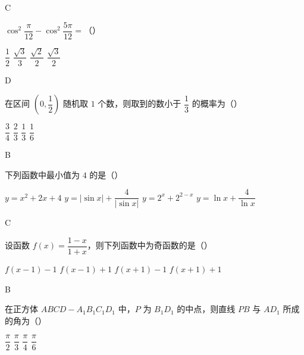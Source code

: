 \begin{answer}
C
\end{answer}

\begin{problem}
\(\cos^2\dfrac{\pi}{12}-\cos^2\dfrac{5\pi}{12}=\)（\quad）

\choices
    {\(\dfrac{1}{2}\)}
    {\(\dfrac{\sqrt3}{3}\)}
    {\(\dfrac{\sqrt2}{2}\)}
    {\(\dfrac{\sqrt3}{2}\)}
\end{problem}

\begin{answer}
D
\end{answer}

\begin{problem}
在区间 \(\left(0,\dfrac{1}{2}\right)\) 随机取 \(1\) 个数，则取到的数小于 \(\dfrac{1}{3}\) 的概率为（\quad）

\choices
    {\(\dfrac{3}{4}\)}
    {\(\dfrac{2}{3}\)}
    {\(\dfrac{1}{3}\)}
    {\(\dfrac{1}{6}\)}
\end{problem}

\begin{answer}
B
\end{answer}

\begin{problem}
下列函数中最小值为 \(4\) 的是（\quad）

\choices
    {\(y=x^2+2x+4\)}
    {\(y=|\sin x|+\dfrac{4}{|\sin x|}\)}
    {\(y=2^x+2^{2-x}\)}
    {\(y=\ln x+\dfrac{4}{\ln x}\)}
\end{problem}

\begin{answer}
C
\end{answer}

\begin{problem}
设函数 \(f(x)=\dfrac{1-x}{1+x}\)，则下列函数中为奇函数的是（\quad）

\choices
    {\(f(x-1)-1\)}
    {\(f(x-1)+1\)}
    {\(f(x+1)-1\)}
    {\(f(x+1)+1\)}
\end{problem}

\begin{answer}
B
\end{answer}

\begin{problem}
在正方体 \(ABCD-A_1B_1C_1D_1\) 中，\(P\) 为 \(B_1D_1\) 的中点，则直线 \(PB\) 与 \(AD_1\) 所成的角为（\quad）

\choices
    {\(\dfrac{\pi}{2}\)}
    {\(\dfrac{\pi}{3}\)}
    {\(\dfrac{\pi}{4}\)}
    {\(\dfrac{\pi}{6}\)}
\end{problem}

